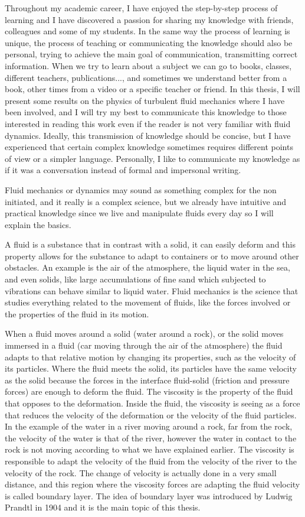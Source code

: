 Throughout my academic career, I have enjoyed the step-by-step process of learning and I have discovered a passion for sharing my knowledge with friends, colleagues and some of my students.
In the same way the process of learning is unique, the process of teaching or communicating the knowledge should also be personal, trying to achieve the main goal of communication, transmitting correct information.
When we try to learn about a subject we can go to books, classes, different teachers, publications..., and sometimes we understand better from a book, other times from a video or a specific teacher or friend.
In this thesis, I will present some results on the physics of turbulent fluid mechanics where I have been involved, and I will try my best to communicate this knowledge to those interested in reading this work even if the reader is not very familiar with fluid dynamics.
Ideally, this transmission of knowledge should be concise, but I have experienced that certain complex knowledge sometimes requires different points of view or a simpler language. Personally, I like to communicate my knowledge as if it was a conversation instead of formal and impersonal writing.

Fluid mechanics or dynamics may sound as something complex for the non initiated, and it really is a complex science, but we already have intuitive and practical knowledge since we live and manipulate fluids every day so I will explain the basics.

A fluid is a substance that in contrast with a solid, it can easily deform and this property allows for the substance to adapt to containers or to move around other obstacles. An example is the air of the atmosphere, the liquid water in the sea, and even solids, like large accumulations of fine sand which subjected to vibrations can behave similar to liquid water.
Fluid mechanics is the science that studies everything related to the movement of fluids, like the forces involved or the properties of the fluid in its motion.

When a fluid moves around a solid (water around a rock), or the solid moves immersed in a fluid  (car moving through the air of the atmosphere) the fluid adapts to that relative motion by changing its properties, such as the velocity of its particles.
Where the fluid meets the solid, its particles have the same velocity as the solid because the forces in the interface fluid-solid (friction and pressure forces) are enough to deform the fluid.
The viscosity is the property of the fluid that opposes to the deformation. Inside the fluid, the viscosity is seeing as a force that reduces the velocity of the deformation or the velocity of the fluid particles.
In the example of the water in a river moving around a rock, far from the rock, the velocity of the water is that of the river, however the water in contact to the rock is not moving according to what we have explained earlier. The viscosity is responsible to adapt the velocity of the fluid from the velocity of the river to the velocity of the rock.
The change of velocity is actually done in a very small distance, and this region where the viscosity forces are adapting the fluid velocity is called boundary layer. 
The idea of boundary layer was introduced by Ludwig Prandtl in 1904 and it is the main topic of this thesis.